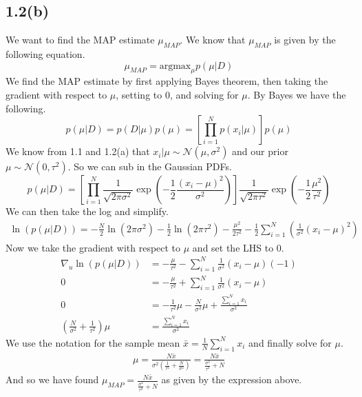 \documentclass[submit]{harvardml}
\begin{document}
\subsection*{1.2(b)}
We want to find the MAP estimate $\mu_{MAP}$. We know that $\mu_{MAP}$ is given by the following equation.
\begin{equation*}
    \mu_{MAP} = \text{argmax}_{\mu} p(\mu | D)
\end{equation*}
We find the MAP estimate by first applying Bayes theorem, then taking the gradient with respect to $\mu$, setting to $0$, and solving for $\mu$. By Bayes we have the following.
\begin{equation*}
    p(\mu | D) = p(D | \mu) p(\mu) = \left[\prod_{i=1}^N p(x_i | \mu)\right]p(\mu)
\end{equation*}
We know from 1.1 and 1.2(a) that $x_i | \mu \sim \mathcal{N}(\mu, \sigma^2)$ and our prior $\mu \sim \mathcal{N}(0, \tau^2)$. So we can sub in the Gaussian PDFs.
\begin{equation*}
    p(\mu | D) = \left[ \prod_{i=1}^N \frac{1}{\sqrt{2 \pi \sigma^2}} \exp\left( - \frac{1}{2} \frac{(x_i - \mu)^2}{\sigma^2} \right)\right] \frac{1}{\sqrt{2 \pi \tau^2}} \exp\left( - \frac{1}{2} \frac{\mu^2}{\tau^2} \right)
\end{equation*}
We can then take the log and simplify.
\begin{align*}
    \ln(p(\mu | D)) = - \frac{N}{2}\ln(2 \pi \sigma^2) - \frac{1}{2}\ln(2 \pi \tau^2) - \frac{\mu^2}{2\tau^2} - \frac{1}{2} \sum_{i=1}^N \left(\frac{1}{\sigma^2} (x_i - \mu)^2 \right)
\end{align*}
Now we take the gradient with respect to $\mu$ and set the LHS to $0$.
\begin{align*}
    \nabla_u \ln(p(\mu | D)) &= - \frac{\mu}{\tau^2} - \sum_{i=1}^N \frac{1}{\sigma^2}(x_i - \mu)(-1) \\
    0 &= - \frac{\mu}{\tau^2} + \sum_{i=1}^N \frac{1}{\sigma^2}(x_i - \mu) \\
    0 &= - \frac{1}{\tau^2}\mu - \frac{N}{\sigma^2}\mu + \frac{\sum_{i=1}^N x_i}{\sigma^2} \\
    \left(\frac{N}{\sigma^2} + \frac{1}{\tau^2}\right)\mu &= \frac{\sum_{i=1}^N x_i}{\sigma^2}
\end{align*}
We use the notation for the sample mean $\bar{x} = \frac{1}{N}\sum_{i=1}^N x_i$ and finally solve for $\mu$.
\begin{align*}
    \mu = \frac{N \bar{x}}{\sigma^2 (\frac{1}{\tau^2} + \frac{N}{\sigma^2})} = \frac{N \bar{x}}{\frac{\sigma^2}{\tau^2} + N}
\end{align*}
And so we have found $\boxed{\mu_{MAP} = \frac{N \bar{x}}{\frac{\sigma^2}{\tau^2} + N}}$ as given by the expression above.
\end{document}
